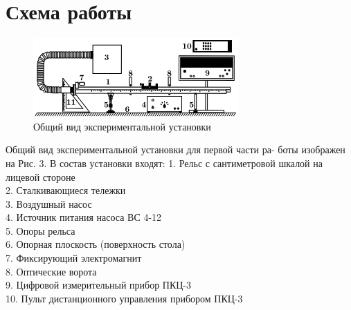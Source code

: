 \documentclass[a4paper]{article}
\begin{document}
\section{\bf{Схема работы}}
\begin{figure}[H]
\includegraphics[width=\textwidth]{pick3.png}
\caption{Общий вид экспериментальной установки}
\end{figure}
Общий вид экспериментальной установки для первой части ра-
боты изображен на Рис. 3. В состав установки входят:
1. Рельс с сантиметровой шкалой на лицевой стороне\\
2. Сталкивающиеся тележки\\
3. Воздушный насос\\
4. Источник питания насоса ВС 4-12\\
5. Опоры рельса\\
6. Опорная плоскость (поверхность стола)\\
7. Фиксирующий электромагнит\\
8. Оптические ворота\\
9. Цифровой измерительный прибор ПКЦ-3\\
10. Пульт дистанционного управления прибором ПКЦ-3\\
\end{document}
